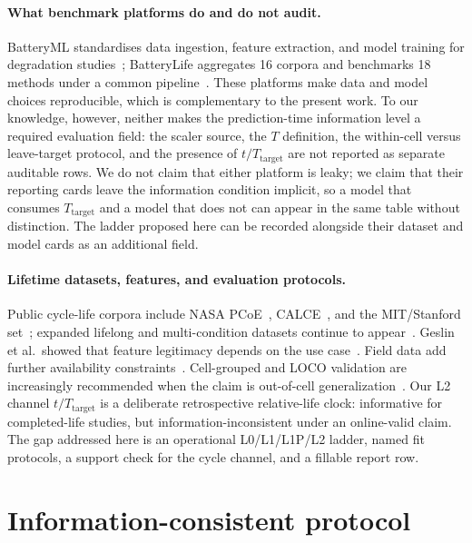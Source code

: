 \documentclass[preprint,12pt]{elsarticle}
\begin{document}
\paragraph{What benchmark platforms do and do not audit.}
BatteryML standardises data ingestion, feature extraction, and model training for degradation studies~\cite{zhang2024batteryml}; BatteryLife aggregates 16 corpora and benchmarks 18 methods under a common pipeline~\cite{tan2025batterylife}.
These platforms make data and model choices reproducible, which is complementary to the present work.
To our knowledge, however, neither makes the prediction-time information level a required evaluation field: the scaler source, the $T$ definition, the within-cell versus leave-target protocol, and the presence of $t/T_{\mathrm{target}}$ are not reported as separate auditable rows.
We do not claim that either platform is leaky; we claim that their reporting cards leave the information condition implicit, so a model that consumes $T_{\mathrm{target}}$ and a model that does not can appear in the same table without distinction.
The ladder proposed here can be recorded alongside their dataset and model cards as an additional field.

\paragraph{Lifetime datasets, features, and evaluation protocols.}
Public cycle-life corpora include NASA PCoE~\cite{saha2007nasa,saha2009compare}, CALCE~\cite{he2011calce}, and the MIT/Stanford set~\cite{severson2019nature}; expanded lifelong and multi-condition datasets continue to appear~\cite{li2024lifetime,tan2025batterylife,zhang2025batlinet}.
Geslin et al.\ showed that feature legitimacy depends on the use case~\cite{geslin2023joule}.
Field data add further availability constraints~\cite{sulzer2021joule}.
Cell-grouped and LOCO validation are increasingly recommended when the claim is out-of-cell generalization~\cite{roman2021,madani2025groupkfold,ali2026loco,barua2026predictor}.
Our L2 channel $t/T_{\mathrm{target}}$ is a deliberate retrospective relative-life clock: informative for completed-life studies, but information-inconsistent under an online-valid claim.
The gap addressed here is an operational L0/L1/L1P/L2 ladder, named fit protocols, a support check for the cycle channel, and a fillable report row.

\section{Information-consistent protocol}
\label{sec:protocol}
\end{document}
